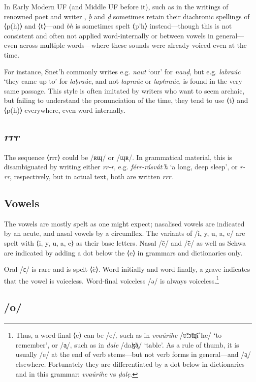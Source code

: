 \documentclass[a4paper, 12pt, twoside, openright, final]{book}
\let \w \textit
\begin{document}
In Early Modern UF (and Middle UF before it), such as in the writings of renowned poet and writer , \w{ḅ} and \w{ḍ} sometimes retain their diachronic spellings of ⟨p(h)⟩ and ⟨t⟩—and \w{bh} is sometimes spelt
⟨p’h⟩ instead—though this is not consistent and often not applied word-internally or between vowels in general—even across multiple
words—where these sounds were already voiced even at the time.

For instance, Snet’h commonly writes e.g. \w{naut} ‘our’ for \w{nauḍ}, but e.g. \w{labraúc} ‘they came up to’ for \w{laḅraúc}, and not
\w{lapraúc} or \w{laphraúc}, is found in the very same passage. This style is often imitated by writers who want to seem archaic, but failing to
understand the pronunciation of the time, they tend to use ⟨t⟩ and ⟨p(h)⟩ everywhere, even word-internally.

\subsection{\textit{rrr}}
The sequence ⟨rrr⟩ could be /ʀɰ/ or /ɰʀ/. In grammatical material, this is disambiguated by writing either \w{rr-r}, e.g.
\w{férr-rásvát’h} ‘a long, deep sleep’, or \w{r-rr}, respectively, but in actual text, both are written \w{rrr}.

\subsection{Vowels}
The vowels are mostly spelt as one might expect; nasalised vowels are indicated by an acute, and nasal vowels by a circumflex.
The variants of /i, y, u, a, e/ are spelt with ⟨i, y, u, a, e⟩ as their base letters. Nasal /ẽ/ and /ẽ̃/ as well as Schwa are
indicated by adding a dot below the ⟨e⟩ in grammars and dictionaries only.

Oral /ɛ/ is rare and is spelt ⟨è⟩. Word-initially and word-finally, a grave indicates that the vowel is voiceless. Word-final
voiceless /ə/ is always voiceless.\footnote{Thus, a word-final ⟨e⟩
can be /e/, such as in \w{vvaúríhe} /ʋ̃ːɔ̃ɰĩˈhe/ ‘to remember’, or /ə̥/, such as in \w{dale} /daɮ̃ə̥/ ‘table’. As a rule of thumb, it is
usually /e/ at the end of verb stems—but not verb forms in general—and /ə̥/ elsewhere. Fortunately they are differentiated by a
dot below in dictionaries and in this grammar: \w{vvaúríhe} vs \w{ḍalẹ}.}

\subsection{/o/}
\end{document}
